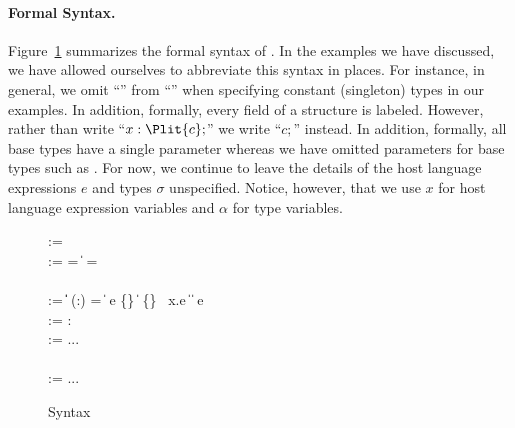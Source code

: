 \paragraph*{Formal Syntax.}
Figure~\ref{fig:ipads-syntax} summarizes the formal syntax of 
\ipads.  In the examples we have discussed, we have allowed ourselves
to abbreviate this syntax in places.  For instance, in general, we
omit ``'' from ``'' 
when specifying constant (singleton) types
in our examples.  In addition, formally, every field of a structure is
labeled.  However, rather than write 
``$x : \Plit{c};$'' we write ``$c;$'' instead.  In addition, formally, all base
types \Pbase{} have a single parameter whereas we have omitted parameters for
base types such as \Puint.  For now, we continue to leave the details
of the host language expressions $e$ and types $\sigma$ unspecified.  Notice, however, that we use $x$ for
host language expression variables and $\alpha$ for \ipads{} type 
variables.


\begin{figure}
\begin{bnf}
    \::=  \; \\
    \::= \alpha = 
  \|  \Prec{} \; \alpha =  \\ \\
    \::= 
     \| \alpha \| \Plit{\const} \nlalt
    \Pfun{} (\var:\ity) =  \| \; e \nlalt
    \Pstruct{} \{\} \| 
    \Punion{} \{\} \nlalt
     \; \Pwhere{} \, x.e \| 
    \Popt{}\;  \nlalt 
     \| 
    \Pcompute{} \; e 
    \\
     \::= \var : 
    \\
     \::= ... \\ \\
   \meta{\sigma}  \::= ...
\end{bnf}
\caption{\ipads{} Syntax}
\label{fig:ipads-syntax}
\end{figure}



